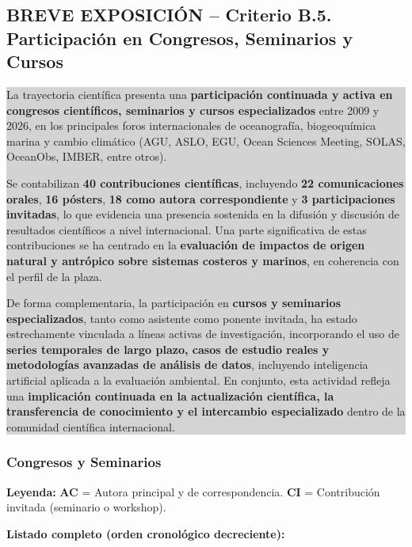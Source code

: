 \documentclass[11pt,a4paper]{article}
\newcommand{\breveexposicion}[2]{
    \subsection*{\color{darkgray}\textbf{BREVE EXPOSICIÓN -- #1}}
    \vspace{0.3em}
    \noindent\colorbox{lightgray}{%
        \begin{minipage}{0.97\textwidth}
        \vspace{0.5em}
        \color{darkgray}
        #2
        \vspace{0.5em}
        \end{minipage}
    }
    \vspace{1em}
}
\begin{document}
\breveexposicion{Criterio B.5. Participación en Congresos, Seminarios y Cursos}{
La trayectoria científica presenta una \textbf{participación continuada y activa en congresos científicos, seminarios y cursos especializados} entre 2009 y 2026, en los principales foros internacionales de oceanografía, biogeoquímica marina y cambio climático (AGU, ASLO, EGU, Ocean Sciences Meeting, SOLAS, OceanObs, IMBER, entre otros).

Se contabilizan \textbf{40 contribuciones científicas}, incluyendo \textbf{22 comunicaciones orales}, \textbf{16 pósters}, \textbf{18 como autora correspondiente} y \textbf{3 participaciones invitadas}, lo que evidencia una presencia sostenida en la difusión y discusión de resultados científicos a nivel internacional. Una parte significativa de estas contribuciones se ha centrado en la \textbf{evaluación de impactos de origen natural y antrópico sobre sistemas costeros y marinos}, en coherencia con el perfil de la plaza.

De forma complementaria, la participación en \textbf{cursos y seminarios especializados}, tanto como asistente como ponente invitada, ha estado estrechamente vinculada a líneas activas de investigación, incorporando el uso de \textbf{series temporales de largo plazo, casos de estudio reales y metodologías avanzadas de análisis de datos}, incluyendo inteligencia artificial aplicada a la evaluación ambiental. En conjunto, esta actividad refleja una \textbf{implicación continuada en la actualización científica, la transferencia de conocimiento y el intercambio especializado} dentro de la comunidad científica internacional.
}

\subsubsection{Congresos y Seminarios}

\textbf{Leyenda:}
\textbf{AC} = Autora principal y de correspondencia.  
\textbf{CI} = Contribución invitada (seminario o workshop).

\vspace{0.5em}

\textbf{Listado completo (orden cronológico decreciente):}
\end{document}
